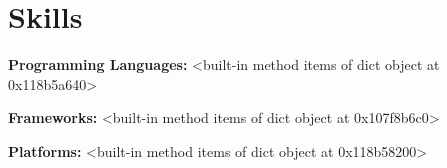 \section{Skills}

    \begin{onecolentry}
        \textbf{Programming Languages:} <built-in method items of dict object at 0x118b5a640>
    \end{onecolentry}

    \vspace{0.05 cm}

    \begin{onecolentry}
        \textbf{Frameworks:} <built-in method items of dict object at 0x107f8b6c0>
    \end{onecolentry}

    \vspace{0.05 cm}

    \begin{onecolentry}
        \textbf{Platforms:} <built-in method items of dict object at 0x118b58200>
    \end{onecolentry}

    \vspace{0.05 cm}

